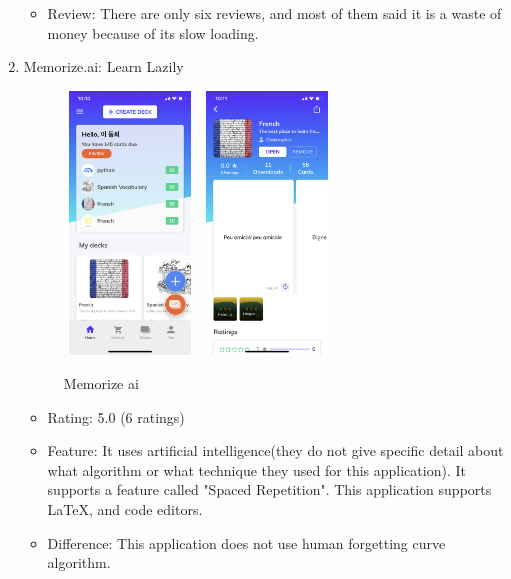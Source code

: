 \documentclass[conference]{IEEEtran}
\begin{document}
\begin{enumerate}
\begin{itemize}
            \item Review: There are only six reviews, and most of them said it is a waste of money because of its slow loading.
        \end{itemize}
    \item Memorize.ai: Learn Lazily
        \begin{figure}[h]
            \centering
            \hfill
            \includegraphics[width=3.5cm, height=7cm]{images/memorizeai1.PNG}
            \hfill
            \includegraphics[width=3.5cm, height=7cm]{images/memorizeai2.PNG}
            \hfill
            \caption{Memorize ai}
        \end{figure}
        \begin{itemize}
            \item Rating: 5.0 (6 ratings)
            \item Feature: It uses artificial intelligence(they do not give specific detail about what algorithm or what technique they used for this application). It supports a feature called "Spaced Repetition". This application supports LaTeX, and code editors. 
            \item Difference: This application does not use human forgetting curve algorithm.

\end{itemize}
\end{enumerate}
\end{document}
